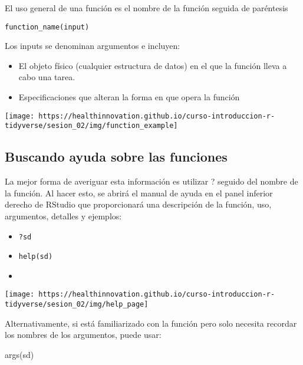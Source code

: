 \documentclass[
]{book}
\newenvironment{Shaded}{\begin{snugshade}}{\end{snugshade}}
\newcommand{\FunctionTok}[1]{\textcolor[rgb]{0.00,0.00,0.00}{#1}}
\newcommand{\NormalTok}[1]{#1}
\providecommand{\tightlist}{%
  \setlength{\itemsep}{0pt}\setlength{\parskip}{0pt}}
\begin{document}
El uso general de una función es el nombre de la función seguida de paréntesis

\begin{verbatim}
function_name(input)
\end{verbatim}

Los inputs se denominan argumentos e incluyen:

\begin{itemize}
\item
  El objeto físico (cualquier estructura de datos) en el que la función lleva a cabo una tarea.
\item
  Especificaciones que alteran la forma en que opera la función
\end{itemize}

\begin{center}\texttt{[image: https://healthinnovation.github.io/curso-introduccion-r-tidyverse/sesion\_02/img/function\_example]} \end{center}

\hypertarget{buscando-ayuda-sobre-las-funciones}{%
\subsection{Buscando ayuda sobre las funciones}\label{buscando-ayuda-sobre-las-funciones}}

La mejor forma de averiguar esta información es utilizar ? seguido del nombre de la función. Al hacer esto, se abrirá el manual de ayuda en el panel inferior derecho de RStudio que proporcionará una descripción de la función, uso, argumentos, detalles y ejemplos:

\begin{itemize}
\tightlist
\item
  \texttt{?sd}
\item
  \texttt{help(sd)}
\item
\end{itemize}

\begin{center}\texttt{[image: https://healthinnovation.github.io/curso-introduccion-r-tidyverse/sesion\_02/img/help\_page]} \end{center}

Alternativamente, si está familiarizado con la función pero solo necesita recordar los nombres de los argumentos, puede usar:

\begin{Shaded}
\begin{Highlighting}[]
\FunctionTok{args}\NormalTok{(sd)}
\end{Highlighting}
\end{Shaded}
\end{document}
